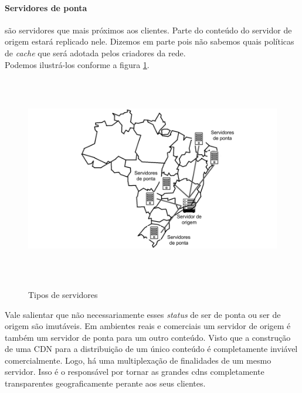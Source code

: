 \paragraph{Servidores de ponta}s\~ao servidores que mais pr\'oximos aos clientes. Parte do conte\'udo do servidor de origem estar\'a replicado nele. Dizemos em parte pois n\~ao sabemos quais pol\'iticas de \textit{cache} que ser\'a adotada pelos criadores da rede. 
\\
Podemos ilustr\'a-los conforme a figura \ref{figura:tipos_servidores}.
\begin{figure}[H]
\caption{Tipos de servidores}
\includegraphics[height=9cm]{Figuras/tipos_servidores.png} 
\label{figura:tipos_servidores} 
\end{figure}

Vale salientar que n\~ao necessariamente esses \textit{status} de ser de ponta ou ser de origem s\~ao imut\'aveis. Em ambientes reais e comerciais um servidor de origem \'e tamb\'em um servidor de ponta para um outro conte\'udo. Visto que a constru\c{c}\~ao de uma CDN para a distribui\c{c}\~ao de um \'unico conte\'udo \'e completamente invi\'avel comercialmente. Logo, h\'a uma multiplexa\c{c}\~ao de finalidades de um mesmo servidor. Isso \'e o respons\'avel por tornar as grandes cdns completamente transparentes geograficamente perante aos seus clientes.